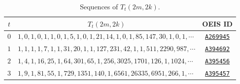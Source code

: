 \begin{table}[H]
  \centering
  \begin{tabular}{|c|l |c|}
    \hline
    \multicolumn{1}{|c|}{$t$} &
    \multicolumn{1}{c|}{$T_t(2m,2k)$} &
    \multicolumn{1}{c|}{OEIS ID} \\
    \hline

    $0$ &
    $1, 0, 1, 0, 1, 1, 0, 1, 5, 1, 0, 1, 21, 14, 1, 0, 1, 85, 147, 30, 1, 0, 1, \cdots $
    & \href{https://oeis.org/A269945}{\texttt{A269945}} \\

    $1$ &
    $1, 1, 1, 1, 7, 1, 1, 31, 20, 1, 1, 127, 231, 42, 1, 1, 511, 2290, 987,\cdots$
    & \href{https://oeis.org/A394692}{\texttt{A394692}} \\

    $2$ &
    $1, 4, 1, 16, 25, 1, 64, 301, 65, 1, 256, 3025, 1701, 126, 1, 1024, \cdots$
    & \href{https://oeis.org/A395456}{\texttt{A395456}} \\

    $3$ &
    $1, 9, 1, 81, 55, 1, 729, 1351, 140, 1, 6561, 26335, 6951, 266, 1, \cdots$
    & \href{https://oeis.org/A395457}{\texttt{A395457}} \\

    \hline
  \end{tabular}
  \caption{Sequences of $T_t(2m,2k)$.}
\end{table}
